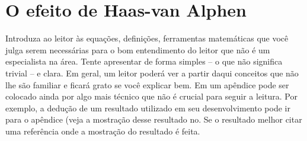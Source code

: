 \documentclass[prd,amsfonts,onecolumn,superscriptaddress,aps,nofootinbib,11pt]{revtex4}
\begin{document}
\section{O efeito de Haas-van Alphen}




Introduza ao leitor às equações, definições, ferramentas matemáticas
que você julga serem necessárias para o bom entendimento do leitor
que não é um especialista na área. Tente apresentar de forma simples
-- o que não significa trivial -- e clara. Em
geral, um leitor poderá ver a partir daqui conceitos que não lhe são
familiar e ficará grato se você explicar bem. Em um apêndice pode
ser colocado ainda por algo mais técnico que não é crucial para seguir
a leitura. Por exemplo, a dedução de um resultado utilizado em seu
desenvolvimento pode ir para o apêndice (veja a mostração desse resultado
no. Se o resultado melhor citar uma referência onde
a mostração do resultado é feita. 




%
%
 








\end{document}
